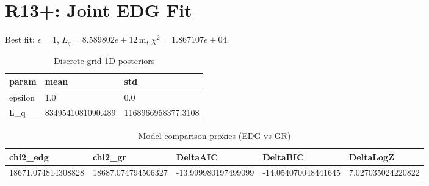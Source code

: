 \section{R13+: Joint EDG Fit}
Best fit: $\epsilon = 1$, $L_q = 8.589802e+12\,\mathrm{m}$, $\chi^2 = 1.867107e+04$.
\begin{table}[h!]
\centering
\caption{Discrete-grid 1D posteriors}
\label{tab:r13p_marg}
\begin{tabular}{l | l | l}
\hline
param & mean & std \\
\hline
epsilon & 1.0 & 0.0 \\
L_q & 8349541081090.489 & 1168966958377.3108 \\
\hline
\end{tabular}
\end{table}

\begin{table}[h!]
\centering
\caption{Model comparison proxies (EDG vs GR)}
\label{tab:r13p_model}
\begin{tabular}{l | l | l | l | l}
\hline
chi2_edg & chi2_gr & DeltaAIC & DeltaBIC & DeltaLogZ \\
\hline
18671.074814308828 & 18687.074794506327 & -13.999980197499099 & -14.054070048441645 & 7.027035024220822 \\
\hline
\end{tabular}
\end{table}

